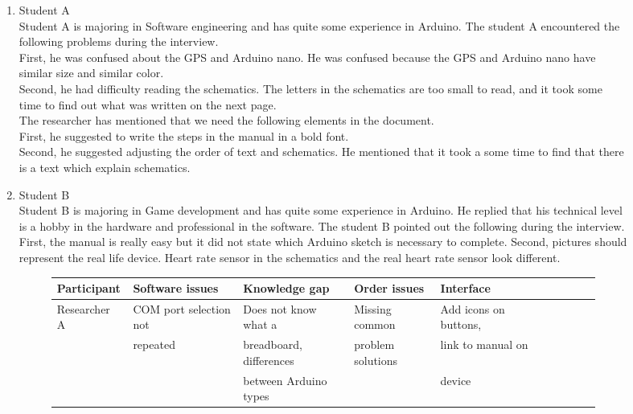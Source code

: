 \documentclass[conference]{IEEEtran}
\begin{document}
\begin{figure*}[ht]
\begin{enumerate}
\begin{enumerate}
					\item Student A\\
					Student A is majoring in Software engineering and has  quite some experience in Arduino. The student A encountered the following problems during the interview.\\
					First, he was confused about the GPS and Arduino nano. He was confused because the GPS and Arduino nano have similar size and similar color.\\
					Second, he had difficulty reading the schematics. The letters in the schematics are too small to read, and it took some time to find out what was written on the next page.\\
					The researcher has mentioned that we need the following elements in the document.\\
					First, he suggested to write the steps in the manual in a bold font.\\
					Second, he suggested adjusting the order of text and schematics. He mentioned that it took a some time to find that there is a text which explain schematics.
					
					\item Student B\\
					Student B is majoring in Game development and has  quite some experience in Arduino. He replied that his technical level is a hobby in the hardware and professional in the software. The student B pointed out the following during the interview.\\
					First, the manual is really easy but it did not state which Arduino sketch is necessary to complete.
					Second, pictures should represent the real life device. Heart rate sensor in the schematics and the real heart rate sensor look different.\\
		\begin{figure*}[!ht]
			\centering
			\begin{tabular}{ | l | l | l | l | l | l | l | l | l | l | }
				\hline
			Participant		& Software issues			& Knowledge gap					& Order issues				& Interface				\\ \hline \hline
			
			
			Researcher A	& COM port selection not	& Does not know what a			& Missing common			& Add icons on buttons,	\\ 
							& repeated					& breadboard, differences		& problem solutions			& link to manual on		\\ 
							& 							& between Arduino types			& 							& device				\\ \hline
							

\end{tabular}
\end{figure*}
\end{enumerate}
\end{enumerate}
\end{figure*}
\end{document}
